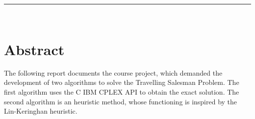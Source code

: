 \documentclass[a4paper,12pt]{article}
\makeatletter
\def\cleardoublepage{\clearpage\if@twoside \ifodd\c@page\else%
  \hbox{}%
  \thispagestyle{empty}%
  \newpage%
  \if@twocolumn\hbox{}\newpage\fi\fi\fi}
\theoremstyle{break}
\makeatother
\begin{document}


\tableofcontents

\listoffigures


\clearpage
\noindent\rule[2pt]{\textwidth}{0.5pt}\\
\section*{Abstract}
The following report documents the course project, which demanded the development of two algorithms to solve the Travelling Salesman Problem. The first algorithm uses the C IBM CPLEX API to obtain the exact solution. The second algorithm is an heuristic method, whose functioning is inspired by the Lin-Keringhan heuristic.


\pagestyle{fancy}

\cleardoublepage






\appendix




\clearpage
\end{document}
